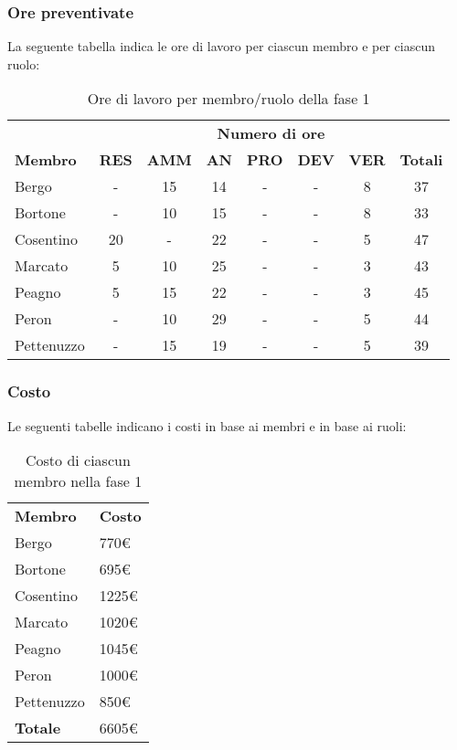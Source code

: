 	\subsubsection{Ore preventivate}
		La seguente tabella indica le ore di lavoro per ciascun membro e per ciascun ruolo:
		\begin{table}[h]
			\centering
			\begin{tabular}{| l | c c c c c c | c |}
				\rowcolor{LightBlue}
				& \multicolumn{7}{c}{\textbf{\color{white}Numero di ore}}	\\
	
				\rowcolor{LightBlue}
				\textbf{\color{white}Membro}
				& \textbf{\color{white}RES}
				& \textbf{\color{white}AMM}
				& \textbf{\color{white}AN}
				& \textbf{\color{white}PRO}
				& \textbf{\color{white}DEV}
				& \textbf{\color{white}VER}
				& \textbf{\color{white}Totali}\\
	
				Bergo 				& - & 15 & 14 & - & - & 8 & 37\\
				Bortone 			& - & 10 & 15	& - & - & 8 & 33\\
				Cosentino 		& 20 & - & 22 & - & - & 5 & 47\\
				Marcato 			& 5 & 10 & 25 & - & - & 3 & 43\\
				Peagno 			& 5 & 15 & 22 & - & - & 3 & 45\\
				Peron 				& - & 10 & 29 & - & - & 5 & 44\\
				Pettenuzzo 	& - & 15 & 19 & - & - & 5 & 39\\ \hline
			\end{tabular}
			\caption{Ore di lavoro per membro/ruolo della fase 1}
		\end{table}
		
	\subsubsection{Costo}
		Le seguenti tabelle indicano i costi in base ai membri e in base ai ruoli:
		\begin{table}[h]
			\centering		
			\begin{tabular}{| l | l |}
				\rowcolor{LightBlue}
				\textbf{\color{white}Membro}
				& \textbf{\color{white}Costo}\\
			
				Bergo 				& 770€\\
				Bortone 			& 695€\\
				Cosentino 		& 1225€\\
				Marcato 			& 1020€\\
				Peagno 			& 1045€\\
				Peron 				& 1000€\\
				Pettenuzzo 	& 850€\\ \hline
				\textbf{Totale} & 6605€\\ \hline
			\end{tabular}
			\caption{Costo di ciascun membro nella fase 1}
		\end{table}
		
